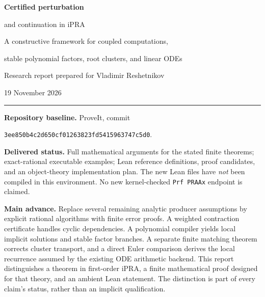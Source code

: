 \documentclass[11pt]{article}
\numberwithin{equation}{section}
\theoremstyle{definition}
\begin{document}
\hypersetup{pageanchor=false}
\begin{titlepage}
\vspace*{12mm}
{\color{ink}\Huge\bfseries Certified perturbation\par and continuation in iPRA\par}
\vspace{8mm}
{\Large A constructive framework for coupled computations,\par stable polynomial factors, root clusters, and linear ODEs}
\vspace{12mm}
{\large Research report prepared for Vladimir Reshetnikov\par 19 November 2026}
\vspace{12mm}
\hrule\vspace{5mm}
\textbf{Repository baseline.} ProveIt, commit\par
\nolinkurl{3ee850b4c2d650cf01263823fd5415963747c5d0}.

\textbf{Delivered status.} Full mathematical arguments for the stated finite theorems; exact-rational executable examples; Lean reference definitions, proof candidates, and an object-theory implementation plan. The new Lean files have \emph{not} been compiled in this environment. No new kernel-checked \texttt{Prf PRAAx} endpoint is claimed.

\textbf{Main advance.} Replace several remaining analytic producer assumptions by explicit rational algorithms with finite error proofs. A weighted contraction certificate handles cyclic dependencies. A polynomial compiler yields local implicit solutions and stable factor branches. A separate finite matching theorem corrects cluster transport, and a direct Euler comparison derives the local recurrence assumed by the existing ODE arithmetic backend.
\vfill
{\small This report distinguishes a theorem in first-order iPRA, a finite mathematical proof designed for that theory, and an ambient Lean statement. The distinction is part of every claim's status, rather than an implicit qualification.}
\end{titlepage}
\hypersetup{pageanchor=true}
\end{document}
